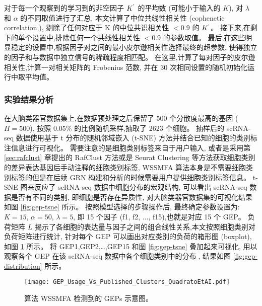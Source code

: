对于每一个观察到的学习到的非空因子 $K^\textup{'}$ 的平均数 (可能小于输入的 $K$),
对 $\lambda$ 和 $\alpha$ 的不同取值进行了汇总,
本文计算了中位共线性相关性 (cophenetic correlation,),
剔除了任何对应于 K 的中位共识相关性 $< 0.9$ 的 $K^\textup{'}$。
接下来,在剩下的单个设置中,排除任何一个共线性相关性 $< 0.9$ 的参数取值。
最后,在这些明显稳定的设置中,根据因子对之间的最小皮尔逊相关性选择最终的超参数,
使得独立的因子和与数据中独立信号的稀疏程度相匹配。
在这里,计算了每对因子的皮尔逊相关性,计算一对相关矩阵的 Frobenius 范数, 
并在 30 次相同设置的随机初始化运行中取平均值。

\subsubsection{实验结果分析}

在大脑类器官数据集上,在数据预处理之后保留了 500 个分散度最高的基因 ($H = 500$),
按照 0.05\% 的比例随机采样,抽取了 2623 个细胞。
抽样后的 scRNA-seq 数据使用基于 t 分布的随机邻域嵌入 (t-SNE) 方法并结合已知的细胞的类别标注信息进行可视化。
需要注意的是细胞类别标签来自于用户输入,
或者是采用第 \ref{sec:rafclust} 章提出的 RafClust 方法或是 Seurat Clustering 等方法获取细胞类别的差异表达基因后手动注释的细胞类别标签, 
WSSMFA 算法本身是不需要细胞类别标签的但是在后续 GRN 构建和分析的时候需要用户提供细胞类别标签信息。
t-SNE 图来反应了 scRNA-seq 数据中细胞分布的宏观结构,
可以看出 scRNA-seq 数据是否有不同的类别,
即细胞是否存在异质性,
对大脑类器官数据集的可视化结果如图 \ref{fig:gep-tsne} 所示。
按照模型选择的步骤操作后,
最终确定参数设置为: $K = 15$, $\alpha = 50$, $\lambda = 5$, 
即 15 个因子 (f1, f2, $\ldots$, f15),也就是对应 15 个 GEP。
负荷矩阵 $L$ 揭示了各细胞的表达量与因子之间的组合线性关系,本文按照细胞类别对负荷矩阵进行统计,
针对每个 GEP 可以画出对应类别的负荷的箱形图 (boxplot),如图 \ref{fig:gep-gep} 所示。
将 GEP1,GEP2,\ldots,GEP15 和图 \ref{fig:gep-tsne} 叠加起来可视化,
用以观察各个 GEP 在该 scRNA-seq 数据中各个细胞类别中的分布,
结果如图 \ref{fig:gep-distribution} 所示。

\begin{figure}[!htbp]
    \centering
    \texttt{[image: GEP\_Usage\_Vs\_Published\_Clusters\_QuadratoEtAI.pdf]}
    \caption{
    算法 WSSMFA 检测到的 GEPs 示意图。
    }
    \label{fig:gep-gep}
\end{figure}

